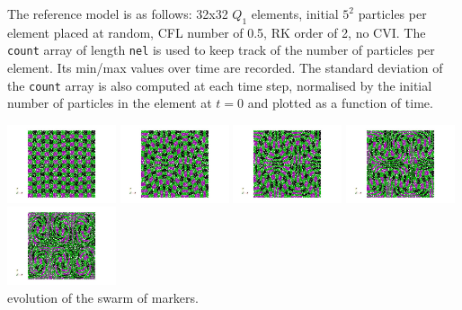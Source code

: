 The reference model is as follows: 32x32 $Q_1$ elements, initial $5^2$ particles per element placed at random, 
CFL number of 0.5, RK order of 2, no CVI.
The {\tt count} array of length {\tt nel} is used to keep track of the number of particles per element. 
Its min/max values over time are recorded. The standard deviation of the {\tt count} array is also 
computed at each time step, normalised by the 
initial number of particles in the element at $t=0$ and plotted as a function of time. 

\begin{center}
\includegraphics[width=3.2cm]{python_codes/fieldstone_30/results_streamline/paint0001}
\includegraphics[width=3.2cm]{python_codes/fieldstone_30/results_streamline/paint0005}
\includegraphics[width=3.2cm]{python_codes/fieldstone_30/results_streamline/paint0010}
\includegraphics[width=3.2cm]{python_codes/fieldstone_30/results_streamline/paint0020}
\includegraphics[width=3.2cm]{python_codes/fieldstone_30/results_streamline/paint0050}\\
{\captionfont evolution of the swarm of markers.}
\end{center} 


